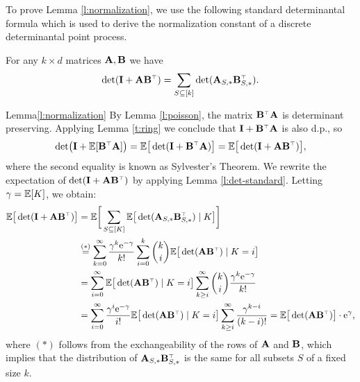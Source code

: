 \documentclass[../../thesis.tex]{subfiles}
\begin{document}
To prove Lemma \ref{l:normalization}, we use the following standard
determinantal formula which is used to derive the normalization
constant of a discrete determinantal point process.
\begin{lemma}\label{l:det-standard}
  For any $k\times d$ matrices $\mathbf A,\mathbf B$ we have
  \[\det(\I+\A\B^\top)=\sum_{S\subseteq[k]}\det(\A_{S,*}\B_{S,*}^\top).\]
\end{lemma}

\begin{proofof}{Lemma}{\ref{l:normalization}}
  By Lemma \ref{l:poisson}, the matrix $\B^\top\A$ is determinant
  preserving. Applying Lemma \ref{t:ring} we conclude that
  $\I+\B^\top\A$ is also d.p., so
  \begin{align*}
    \det\!\big(\I+\E[\B^\top\A]\big) = \E\big[\det(\I+\B^\top\A)\big] =\E\big[\det(\I+\A\B^\top)\big],
  \end{align*}
  where the second equality is known as Sylvester's Theorem.
  We rewrite the expectation of $\det(\I+\A\B^\top)$ by applying Lemma
  \ref{l:det-standard}.  Letting $\gamma=\mathbb E[K]$, we obtain:
  \begin{align*}
    \E\big[\det(\I+\A\B^\top)\big] & =\E\bigg[\sum_{S\subseteq [K]}\E\big[\det(\A_{S,*}\B_{S,*}^\top)\mid
    K\big]\bigg]                                                                                          \\
                                   & \overset{(*)}{=}\sum_{k=0}^\infty\frac{\gamma^k\ee^{-\gamma}}{k!}
    \sum_{i=0}^k\binom{k}{i} \E\big[\det(\A\B^\top)\mid K=i\big]                                          \\
                                   & =\sum_{i=0}^\infty \E\big[\det(\A\B^\top)\mid K=i\big]
    \sum_{k\geq i}^\infty \binom{k}{i}
    \frac{\gamma^k\ee^{-\gamma}}{k!}                                                                      \\
                                   & =\sum_{i=0}^\infty
    \frac{\gamma^i\ee^{-\gamma}}{i!}\E\big[\det(\A\B^\top)\mid K=i\big]
    \sum_{k\geq i}^\infty\frac{\gamma^{k-i}}{(k-i)!} = \E\big[\det(\A\B^\top)\big]\cdot\ee^\gamma,
  \end{align*}
  where $(*)$ follows from the exchangeability of the rows of $\mathbf A$ and
  $\mathbf B$, which implies that the distribution of $\A_{S,*}\B_{S,*}^\top$ is the
  same for all subsets $S$ of a fixed size $k$.
\end{proofof}
\end{document}

